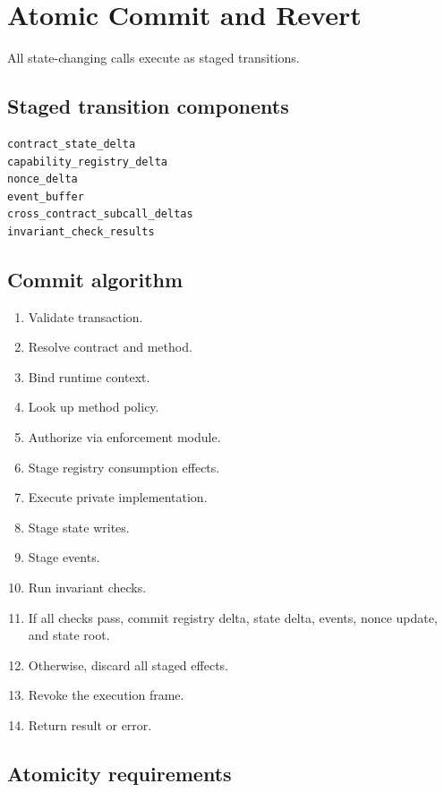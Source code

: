\section{Atomic Commit and Revert}

All state-changing calls execute as staged transitions.

\subsection{Staged transition components}

\begin{lstlisting}
contract_state_delta
capability_registry_delta
nonce_delta
event_buffer
cross_contract_subcall_deltas
invariant_check_results
\end{lstlisting}

\subsection{Commit algorithm}

\begin{enumerate}
  \item Validate transaction.
  \item Resolve contract and method.
  \item Bind runtime context.
  \item Look up method policy.
  \item Authorize via enforcement module.
  \item Stage registry consumption effects.
  \item Execute private implementation.
  \item Stage state writes.
  \item Stage events.
  \item Run invariant checks.
  \item If all checks pass, commit registry delta, state delta, events, nonce update, and state root.
  \item Otherwise, discard all staged effects.
  \item Revoke the execution frame.
  \item Return result or error.
\end{enumerate}

\subsection{Atomicity requirements}


